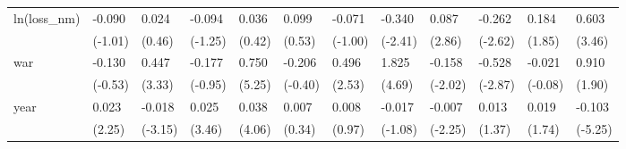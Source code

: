 \begin{tabular}{p{1.5cm} p{2cm} p{1.7cm} p{1.7cm} p{1.7cm} p{1.7cm} p{1.7cm} p{1.7cm} p{1.7cm} p{1.7cm} p{1.7cm} p{1.7cm}}
\hline
ln(loss\_nm)     &   -0.090         &    0.024         &   -0.094         &    0.036         &    0.099         &   -0.071         &   -0.340\sym{*}  &    0.087\sym{**} &   -0.262\sym{*}  &    0.184         &    0.603\sym{**} \\
                &  (-1.01)         &   (0.46)         &  (-1.25)         &   (0.42)         &   (0.53)         &  (-1.00)         &  (-2.41)         &   (2.86)         &  (-2.62)         &   (1.85)         &   (3.46)         \\
war             &   -0.130         &    0.447\sym{**} &   -0.177         &    0.750\sym{***}&   -0.206         &    0.496\sym{*}  &    1.825\sym{***}&   -0.158         &   -0.528\sym{**} &   -0.021         &    0.910         \\
                &  (-0.53)         &   (3.33)         &  (-0.95)         &   (5.25)         &  (-0.40)         &   (2.53)         &   (4.69)         &  (-2.02)         &  (-2.87)         &  (-0.08)         &   (1.90)         \\
year            &    0.023\sym{*}  &   -0.018\sym{**} &    0.025\sym{**} &    0.038\sym{**} &    0.007         &    0.008         &   -0.017         &   -0.007\sym{*}  &    0.013         &    0.019         &   -0.103\sym{***}\\
                &   (2.25)         &  (-3.15)         &   (3.46)         &   (4.06)         &   (0.34)         &   (0.97)         &  (-1.08)         &  (-2.25)         &   (1.37)         &   (1.74)         &  (-5.25)         \\
\end{tabular}
